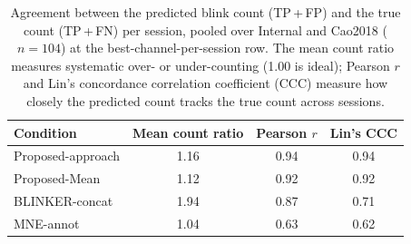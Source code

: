 \begin{table}[ht]
  \centering
  \caption{Agreement between the predicted blink count (TP\,+\,FP) and the true count (TP\,+\,FN) per session, pooled over Internal and Cao2018 ($n=104$) at the best-channel-per-session row. The mean count ratio measures systematic over- or under-counting (1.00 is ideal); Pearson $r$ and Lin's concordance correlation coefficient (CCC) measure how closely the predicted count tracks the true count across sessions.}
  \label{tab:count_agreement}
  \begin{tabular}{lccc}
    \toprule
    Condition & Mean count ratio & Pearson $r$ & Lin's CCC \\
    \midrule
    Proposed-approach & 1.16 & 0.94 & 0.94 \\
    Proposed-Mean & 1.12 & 0.92 & 0.92 \\
    BLINKER-concat & 1.94 & 0.87 & 0.71 \\
    MNE-annot & 1.04 & 0.63 & 0.62 \\
    \bottomrule
  \end{tabular}
\end{table}
